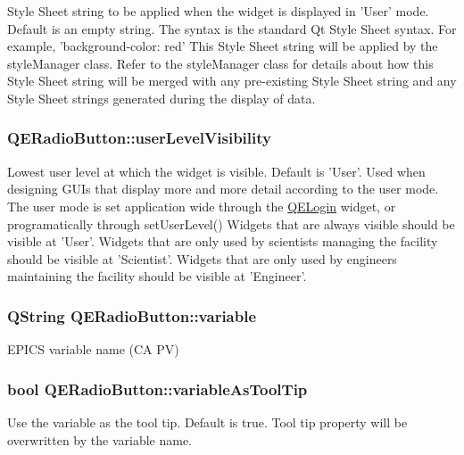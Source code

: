 Style Sheet string to be applied when the widget is displayed in 'User' mode. Default is an empty string. The syntax is the standard Qt Style Sheet syntax. For example, 'background-\/color: red' This Style Sheet string will be applied by the styleManager class. Refer to the styleManager class for details about how this Style Sheet string will be merged with any pre-\/existing Style Sheet string and any Style Sheet strings generated during the display of data. \hypertarget{classQERadioButton_a707c662aa4b125d0fc54c9eae4471a0d}{
\subsubsection[{userLevelVisibility}]{ QERadioButton::userLevelVisibility}}
\label{classQERadioButton_a707c662aa4b125d0fc54c9eae4471a0d}
Lowest user level at which the widget is visible. Default is 'User'. Used when designing GUIs that display more and more detail according to the user mode. The user mode is set application wide through the \hyperlink{classQELogin}{QELogin} widget, or programatically through setUserLevel() Widgets that are always visible should be visible at 'User'. Widgets that are only used by scientists managing the facility should be visible at 'Scientist'. Widgets that are only used by engineers maintaining the facility should be visible at 'Engineer'. \hypertarget{classQERadioButton_a86f163446433bab555f21d69754ad309}{
\subsubsection[{variable}]{\setlength{\rightskip}{0pt plus 5cm}QString QERadioButton::variable}}
\label{classQERadioButton_a86f163446433bab555f21d69754ad309}
EPICS variable name (CA PV) \hypertarget{classQERadioButton_affd89606cebad3bbe85a7ea394b004cb}{
\subsubsection[{variableAsToolTip}]{\setlength{\rightskip}{0pt plus 5cm}bool QERadioButton::variableAsToolTip}}
\label{classQERadioButton_affd89606cebad3bbe85a7ea394b004cb}
Use the variable as the tool tip. Default is true. Tool tip property will be overwritten by the variable name. 

